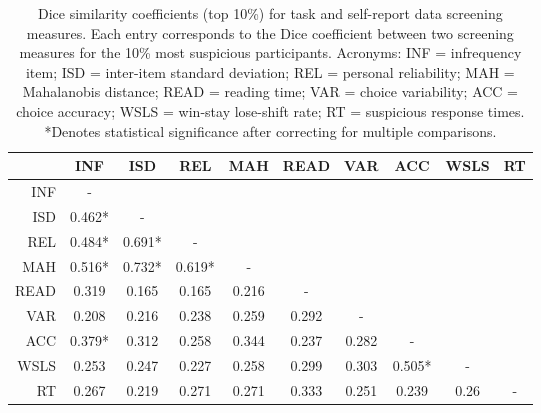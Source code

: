 \documentclass[a4paper,notitlepage,12pt]{article}
\begin{document}
\begin{refsection}[supp]
\begin{table}[H]
\centering
\small
\begin{tabular}{rccccccccc}
\toprule
{} &     INF &     ISD &     REL &    MAH &   READ &    VAR &     ACC &  WSLS & RT \\
\midrule
INF  &       - &         &         &        &        &        &         &       &    \\
ISD  &  0.462* &       - &         &        &        &        &         &       &    \\
REL  &  0.484* &  0.691* &       - &        &        &        &         &       &    \\
MAH  &  0.516* &  0.732* &  0.619* &      - &        &        &         &       &    \\
READ &   0.319 &   0.165 &   0.165 &  0.216 &      - &        &         &       &    \\
VAR  &   0.208 &   0.216 &   0.238 &  0.259 &  0.292 &      - &         &       &    \\
ACC  &  0.379* &   0.312 &   0.258 &  0.344 &  0.237 &  0.282 &       - &       &    \\
WSLS &   0.253 &   0.247 &   0.227 &  0.258 &  0.299 &  0.303 &  0.505* &     - &    \\
RT   &   0.267 &   0.219 &   0.271 &  0.271 &  0.333 &  0.251 &   0.239 &  0.26 &  - \\
\bottomrule
\end{tabular}
\captionsetup{width=0.88\textwidth}
\caption{Dice similarity coefficients (top 10\%) for task and self-report data screening measures. Each entry corresponds to the Dice coefficient between two screening measures for the 10\% most suspicious participants. Acronyms: INF = infrequency item; ISD = inter-item standard deviation; REL = personal reliability; MAH = Mahalanobis distance; READ = reading time; VAR = choice variability; ACC = choice accuracy; WSLS = win-stay lose-shift rate; RT = suspicious response times. *Denotes statistical significance after correcting for multiple comparisons.}
\end{table}


\end{refsection}
\end{document}
